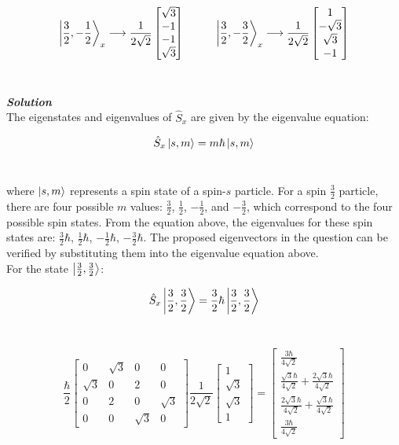 \documentclass[9pt]{extarticle}
\newcommand{\bfit}[1]{\textbf{\textit{#1}}}
\begin{document}
\begin{multicols*}{2}
$$
\ket{\frac 32 , -\frac 12}_x \longrightarrow \frac{1}{2\sqrt 2} 
\begin{bmatrix}
        \sqrt 3 \\ 
        -1 \\
        -1 \\
        \sqrt 3
\end{bmatrix}
\hspace{1cm}
\ket{\frac 32 , -\frac 32}_x \longrightarrow \frac{1}{2\sqrt 2}
\begin{bmatrix}
        1 \\ 
        -\sqrt 3 \\ 
        \sqrt 3 \\ 
        -1
\end{bmatrix}
$$ \ 

{\bfit{Solution}} \\ 
The eigenstates and eigenvalues of $\hat S_x$ are given by the eigenvalue equation:

$$\hat S_x \ket{s,m} = m \hbar \ket{s,m}$$ \ 

where $\ket{s,m}$ represents a spin state of a spin-$s$ particle. For a spin $\frac 32$ particle, there are four possible $m$ values: $\frac 32$, $\frac 12$, $-\frac 12$, and $-\frac 32$, which correspond to the four possible spin states. From the equation above, the eigenvalues for these spin states are: $\frac 32 \hbar$, $\frac 12 \hbar$, $-\frac 12 \hbar$, $-\frac 32 \hbar$. The proposed eigenvectors in the question can be verified by substituting them into the eigenvalue equation above. \\ 

For the state $\ket{\frac 32, \frac 32}$:

$$\hat S_x \ket{\frac 32, \frac 32} = \frac 32 \hbar \ket{\frac 32, \frac 32}$$ \ 

$$
\frac \hbar 2
\begin{bmatrix}
        0 & \sqrt 3 & 0 & 0 \\
        \sqrt 3 & 0 & 2 & 0 \\
        0 & 2 & 0 & \sqrt 3 \\
        0 & 0 & \sqrt 3 & 0
\end{bmatrix}
\frac{1}{2\sqrt 2}
\begin{bmatrix}
        1 \\
        \sqrt 3 \\
        \sqrt 3 \\
        1
\end{bmatrix}
= 
\begin{bmatrix}
	\frac{3\hbar}{4\sqrt 2} \\ 
	\frac{\sqrt 3 \hbar}{4\sqrt 2} + \frac{2 \sqrt 3 \hbar}{4 \sqrt 2} \\ 
	\frac{2 \sqrt 3 \hbar}{4 \sqrt 2} + \frac{\sqrt 3 \hbar}{4\sqrt 2} \\ 
	\frac{3\hbar}{4\sqrt 2}
\end{bmatrix}
$$


\end{multicols*}
\end{document}
